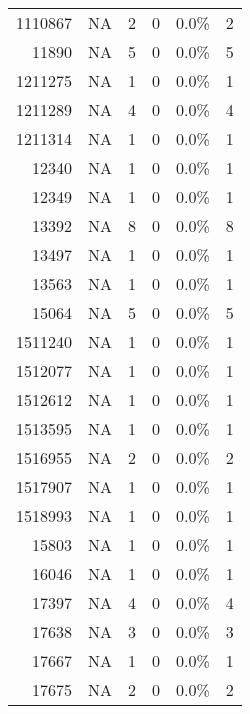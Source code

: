 \begin{longtable}{lrrrrr}
	    \multicolumn{1}{r}{1110867} & NA    & 2     & 0     & 0.0\% & 2 \\
	    \multicolumn{1}{r}{11890} & NA    & 5     & 0     & 0.0\% & 5 \\
	    \multicolumn{1}{r}{1211275} & NA    & 1     & 0     & 0.0\% & 1 \\
	    \multicolumn{1}{r}{1211289} & NA    & 4     & 0     & 0.0\% & 4 \\
	    \multicolumn{1}{r}{1211314} & NA    & 1     & 0     & 0.0\% & 1 \\
	    \multicolumn{1}{r}{12340} & NA    & 1     & 0     & 0.0\% & 1 \\
	    \multicolumn{1}{r}{12349} & NA    & 1     & 0     & 0.0\% & 1 \\
	    \multicolumn{1}{r}{13392} & NA    & 8     & 0     & 0.0\% & 8 \\
	    \multicolumn{1}{r}{13497} & NA    & 1     & 0     & 0.0\% & 1 \\
	    \multicolumn{1}{r}{13563} & NA    & 1     & 0     & 0.0\% & 1 \\
	    \multicolumn{1}{r}{15064} & NA    & 5     & 0     & 0.0\% & 5 \\
	    \multicolumn{1}{r}{1511240} & NA    & 1     & 0     & 0.0\% & 1 \\
	    \multicolumn{1}{r}{1512077} & NA    & 1     & 0     & 0.0\% & 1 \\
	    \multicolumn{1}{r}{1512612} & NA    & 1     & 0     & 0.0\% & 1 \\
	    \multicolumn{1}{r}{1513595} & NA    & 1     & 0     & 0.0\% & 1 \\
	    \multicolumn{1}{r}{1516955} & NA    & 2     & 0     & 0.0\% & 2 \\
	    \multicolumn{1}{r}{1517907} & NA    & 1     & 0     & 0.0\% & 1 \\
	    \multicolumn{1}{r}{1518993} & NA    & 1     & 0     & 0.0\% & 1 \\
	    \multicolumn{1}{r}{15803} & NA    & 1     & 0     & 0.0\% & 1 \\
	    \multicolumn{1}{r}{16046} & NA    & 1     & 0     & 0.0\% & 1 \\
	    \multicolumn{1}{r}{17397} & NA    & 4     & 0     & 0.0\% & 4 \\
	    \multicolumn{1}{r}{17638} & NA    & 3     & 0     & 0.0\% & 3 \\
	    \multicolumn{1}{r}{17667} & NA    & 1     & 0     & 0.0\% & 1 \\
	    \multicolumn{1}{r}{17675} & NA    & 2     & 0     & 0.0\% & 2 \\

\end{longtable}
